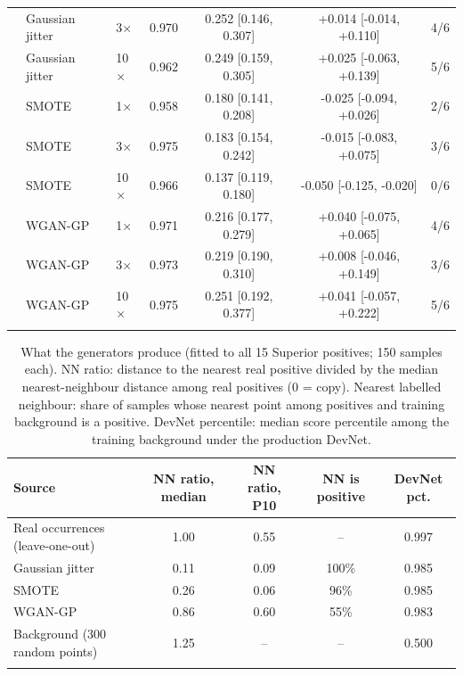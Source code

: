 \documentclass[pdflatex,sn-apa]{sn-jnl}
\begin{document}
\begin{table}[t]
\begin{tabular*}{\textwidth}{@{\extracolsep\fill}lllcccc}
 & Gaussian jitter & 3$\times$ & 0.970 & 0.252 [0.146, 0.307] & +0.014 [-0.014, +0.110] & 4/6 \\
 & Gaussian jitter & 10$\times$ & 0.962 & 0.249 [0.159, 0.305] & +0.025 [-0.063, +0.139] & 5/6 \\
 & SMOTE & 1$\times$ & 0.958 & 0.180 [0.141, 0.208] & -0.025 [-0.094, +0.026] & 2/6 \\
 & SMOTE & 3$\times$ & 0.975 & 0.183 [0.154, 0.242] & -0.015 [-0.083, +0.075] & 3/6 \\
 & SMOTE & 10$\times$ & 0.966 & 0.137 [0.119, 0.180] & -0.050 [-0.125, -0.020] & 0/6 \\
 & WGAN-GP & 1$\times$ & 0.971 & 0.216 [0.177, 0.279] & +0.040 [-0.075, +0.065] & 4/6 \\
 & WGAN-GP & 3$\times$ & 0.973 & 0.219 [0.190, 0.310] & +0.008 [-0.046, +0.149] & 3/6 \\
 & WGAN-GP & 10$\times$ & 0.975 & 0.251 [0.192, 0.377] & +0.041 [-0.057, +0.222] & 5/6 \\
\botrule
\end{tabular*}
\end{table}

\begin{table}[t]
\caption{What the generators produce (fitted to all 15 Superior positives; 150 samples each). NN ratio: distance to the nearest real positive divided by the median nearest-neighbour distance among real positives (0 = copy). Nearest labelled neighbour: share of samples whose nearest point among positives and training background is a positive. DevNet percentile: median score percentile among the training background under the production DevNet.}\label{tab:aug-diag}
\footnotesize
\setlength{\tabcolsep}{2.5pt}
\begin{tabular*}{\textwidth}{@{\extracolsep\fill}lcccc}
\toprule
Source & NN ratio, median & NN ratio, P10 & NN is positive & DevNet pct. \\
\midrule
Real occurrences (leave-one-out) & 1.00 & 0.55 & -- & 0.997 \\
Gaussian jitter & 0.11 & 0.09 & 100\% & 0.985 \\
SMOTE & 0.26 & 0.06 & 96\% & 0.985 \\
WGAN-GP & 0.86 & 0.60 & 55\% & 0.983 \\
Background (300 random points) & 1.25 & -- & -- & 0.500 \\
\botrule
\end{tabular*}
\end{table}
\end{document}
